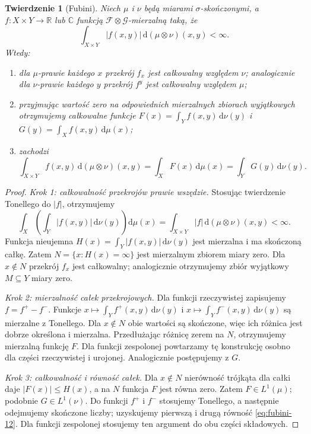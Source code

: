 \documentclass[11pt,a4paper,oneside]{book}
\numberwithin{equation}{chapter}
\theoremstyle{plain}
\newtheorem{twierdzenie}{Twierdzenie}[chapter]
\theoremstyle{definition}
\theoremstyle{remark}
\begin{document}
\begin{twierdzenie}[Fubini]
\label{thm:fubini-12}
Niech $\mu$ i $\nu$ będą miarami $\sigma$-skończonymi,
a $f:X\times Y\to\mathbb R$ lub $\mathbb C$ funkcją
$\mathcal F\otimes\mathcal G$-mierzalną taką, że
\begin{equation}\label{eq:abs-fubini-12}
\int_{X\times Y}|f(x,y)|\,\mathrm d(\mu\otimes\nu)(x,y)<\infty.
\end{equation}
Wtedy:
\begin{enumerate}[label=\textup{(\roman*)}]
\item dla $\mu$-prawie każdego $x$ przekrój $f_x$ jest
      całkowalny względem $\nu$; analogicznie dla
      $\nu$-prawie każdego $y$ przekrój $f^y$ jest
      całkowalny względem $\mu$;
\item przyjmując wartość zero na odpowiednich
      mierzalnych zbiorach wyjątkowych otrzymujemy
      całkowalne funkcje
      $F(x)=\int_Y f(x,y)\,\mathrm d\nu(y)$ i
      $G(y)=\int_X f(x,y)\,\mathrm d\mu(x)$;
\item zachodzi
\begin{equation}\label{eq:fubini-12}
\int_{X\times Y}f(x,y)\,\mathrm d(\mu\otimes\nu)(x,y)
=\int_XF(x)\,\mathrm d\mu(x)
=\int_YG(y)\,\mathrm d\nu(y).
\end{equation}
\end{enumerate}
\end{twierdzenie}
\begin{proof}
\emph{Krok 1: całkowalność przekrojów prawie wszędzie.}
Stosując twierdzenie Tonellego do $|f|$,
otrzymujemy
\[
\int_X\left(\int_Y|f(x,y)|\,\mathrm d\nu(y)\right)
\mathrm d\mu(x)
=\int_{X\times Y}|f|\,\mathrm d(\mu\otimes\nu)(x,y)<\infty.
\]
Funkcja nieujemna $H(x)=\int_Y|f(x,y)|\,\mathrm d\nu(y)$
jest mierzalna i ma skończoną całkę. Zatem
$N=\{x:H(x)=\infty\}$ jest mierzalnym zbiorem
miary zero. Dla $x\notin N$ przekrój $f_x$
jest całkowalny; analogicznie otrzymujemy zbiór
wyjątkowy $M\subseteq Y$ miary zero.

\emph{Krok 2: mierzalność całek przekrojowych.}
Dla funkcji rzeczywistej zapisujemy $f=f^+-f^-$.
Funkcje $x\mapsto\int_Y f^+(x,y)\,\mathrm d\nu(y)$
i $x\mapsto\int_Y f^-(x,y)\,\mathrm d\nu(y)$
są mierzalne z Tonellego. Dla $x\notin N$
obie wartości są skończone, więc ich różnica
jest dobrze określona i mierzalna. Przedłużając
różnicę zerem na $N$, otrzymujemy mierzalną
funkcję $F$. Dla funkcji zespolonej powtarzamy
tę konstrukcję osobno dla części rzeczywistej
i urojonej. Analogicznie postępujemy z $G$.

\emph{Krok 3: całkowalność i równość całek.}
Dla $x\notin N$ nierówność trójkąta dla całki
daje $|F(x)|\le H(x)$, a na $N$ funkcja $F$
jest równa zero. Zatem $F\in L^1(\mu)$;
podobnie $G\in L^1(\nu)$.
Do funkcji $f^+$ i $f^-$ stosujemy Tonellego,
a następnie odejmujemy skończone liczby;
uzyskujemy pierwszą i drugą równość
\eqref{eq:fubini-12}. Dla funkcji zespolonej
stosujemy ten argument do obu części składowych.
\end{proof}
\end{document}
